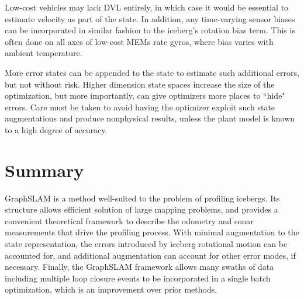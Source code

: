 Low-cost vehicles may lack DVL entirely, in which case it would be essential to estimate velocity as part of the state. In addition, any time-varying sensor biases can be incorporated in similar fashion to the iceberg's rotation bias term. This is often done on all axes of low-cost MEMs rate gyros, where bias varies with ambient temperature. 

More error states can be appended to the state to estimate such additional errors, but not without risk. Higher dimension state spaces increase the size of the optimization, but more importantly, can give optimizers more places to ``hide" errors. Care must be taken to avoid having the optimizer exploit such state augmentations and produce nonphysical results, unless the plant model is known to a high degree of accuracy.
 
\label{sec.DesignConsiderations}

\section{Summary}

GraphSLAM is a method well-suited to the problem of profiling icebergs. Its structure allows efficient solution of large mapping problems, and provides a convenient theoretical framework to describe the odometry and sonar measurements that drive the profiling process. With minimal augmentation to the state representation, the errors introduced by iceberg rotational motion can be accounted for, and additional augmentation can account for other error modes, if necessary. Finally, the GraphSLAM framework allows many swaths of data including multiple loop closure events to be incorporated in a single batch optimization, which is an improvement over prior methods.